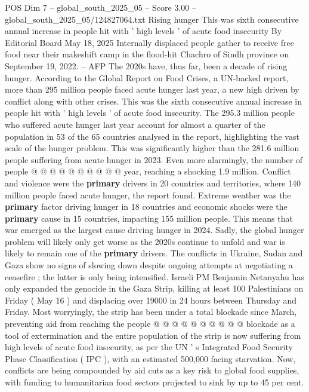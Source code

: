 \begin{textsample}{POS Dim 7 – global\_south\_2025\_05 – Score 3.00 – global\_south\_2025\_05/124827064.txt}  \label{ex:f7_pos_440}
Rising hunger This was sixth consecutive annual increase in people hit with ' high levels ' of acute food insecurity By Editorial Board May 18, 2025 Internally displaced people gather to receive free food near their makeshift camp in the flood-hit Chachro of Sindh province on September 19, 2022. -- AFP The 2020s have, thus far, been a decade of rising hunger.
According to the Global Report on Food Crises, a UN-backed report, more than 295 million people faced acute hunger last year, a new high driven by conflict along with other crises.
This was the sixth consecutive annual increase in people hit with ' high levels ' of acute food insecurity.
The 295.3 million people who suffered acute hunger last year account for almost a quarter of the population in 53 of the 65 countries analysed in the report, highlighting the vast scale of the hunger problem.
This was significantly higher than the 281.6 million people suffering from acute hunger in 2023.
Even more alarmingly, the number of people @ @ @ @ @ @ @ @ @ @ year, reaching a shocking 1.9 million.
Conflict and violence were the \textbf{primary} drivers in 20 countries and territories, where 140 million people faced acute hunger, the report found.
Extreme weather was the \textbf{primary} factor driving hunger in 18 countries and economic shocks were the \textbf{primary} cause in 15 countries, impacting 155 million people.
This means that war emerged as the largest cause driving hunger in 2024.
Sadly, the global hunger problem will likely only get worse as the 2020s continue to unfold and war is likely to remain one of the \textbf{primary} drivers.
The conflicts in Ukraine, Sudan and Gaza show no signs of slowing down despite ongoing attempts at negotiating a ceasefire ; the latter is only being intensified.
Israeli PM Benjamin Netanyahu has only expanded the genocide in the Gaza Strip, killing at least 100 Palestinians on Friday ( May 16 ) and displacing over 19000 in 24 hours between Thursday and Friday.
Most worryingly, the strip has been under a total blockade since March, preventing aid from reaching the people @ @ @ @ @ @ @ @ @ @ blockade as a tool of extermination and the entire population of the strip is now suffering from high levels of acute food insecurity, as per the UN ' s Integrated Food Security Phase Classification ( IPC ), with an estimated 500,000 facing starvation.
Now, conflicts are being compounded by aid cuts as a key risk to global food supplies, with funding to humanitarian food sectors projected to sink by up to 45 per cent.

\end{textsample}
